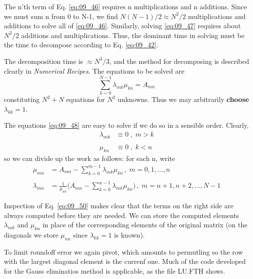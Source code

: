 The n'th term of Eq. \ref{eq:09_46} requires n multiplications and n additions.
Since we must sum n from 0 to N-1, we find $N(N-1)/2 \approx N^2/2$
multiplications and additions to solve all of \ref{eq:09_46}. Similarly, solving 
\ref{eq:09_47} requires about $N^2/2$ additions and multiplications. Thus, the
dominant time in solving must be the time to decompose according to Eq. \ref{eq:09_42}.

The decomposition time is $\approx N^3/3$, and the method for decomposing is
described clearly in \textit{Numerical Recipes}. The equations
to be solved are
\begin{equation}
    \label{eq:09_48}
    \sum_{k=0}^{N-1}\lambda_{mk}\mu_{kn}=A_{mn}
\end{equation}
constituting $N^2 + N$ equations for $N^2$ unknowns. Thus we may
arbitrarily \textbf{choose} $\lambda_{kk} = 1$.

The equations \ref{eq:09_48} are easy to solve if we do so in a sensible order.
Clearly,
\begin{align}
    \label{eq:09_49}
    \lambda_{mk} &\equiv 0\;,\; m > k  \nonumber \\
    &\\
    \mu_{kn} &\equiv 0\;,\; k < n  \nonumber
\end{align}
so we can divide up the work as follows: for each n, write
\begin{align}
    \label{eq:09_50}
    \mu_{mn} &= A_{mn} - \sum_{k=0}^{m-1}\lambda_{mk}\mu_{kn}\,,\;m=0,1,\dotsc,n  \nonumber \\
    & \\
    \lambda_{mn} &=\frac{1}{\mu_{nn}}\Big(A_{mn}-\sum_{k=0}^{n-1}\lambda_{mk}\mu_{kn}\Big)\,,\; m=n+1, n+2, \dotsc, N-1  \nonumber
\end{align}

Inspection of Eq. \ref{eq:09_50} makes clear that the terms on the right side
are always computed before they are needed. We can store the
computed elements $\lambda_{mk}$ and $\mu_{kn}$ in place of the corresponding
elements of the original matrix (on the diagonals we store  $\mu_{nn}$
since $\lambda_{kk} = 1$ is known).

To limit roundoff error we again pivot, which amounts to permutling so the row with the largest diagonal element is the currenf one. Much of the code developed for the Gauss eliminatios method is applicable, as the file LU.FTH shows.
